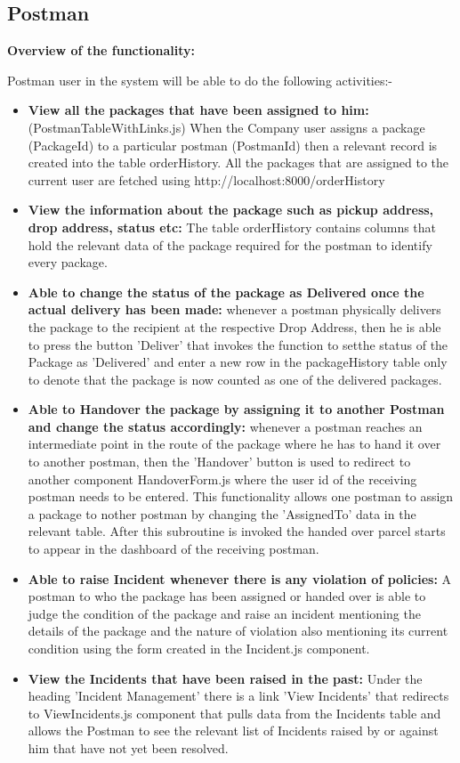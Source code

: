 \subsection{Postman}
\textbf{Overview of the functionality:}

Postman user in the system will be able to do the following activities:-
\begin{itemize}
\item {\textbf{View all the packages that have been assigned to him: }}(PostmanTableWithLinks.js) When the Company user assigns a package (PackageId) to a particular postman (PostmanId) then a relevant record is created into the table orderHistory. All the packages that are assigned to the current user are fetched using http://localhost:8000/orderHistory

\item \textbf{View the information about the package such as pickup address, drop address, status etc:} The table orderHistory contains columns that hold the relevant data of the package required for the postman to identify every package.
\item \textbf{Able to change the status of the package as Delivered once the actual delivery has been made:} whenever a postman physically delivers the package to the recipient at the respective Drop Address, then he is able to press the button 'Deliver' that invokes the function to setthe status of the Package as 'Delivered' and enter a new row in the packageHistory table only to denote that the package is now counted as one of the delivered packages.
\item \textbf{Able to Handover the package by assigning it to another Postman and change the status accordingly: }whenever a postman reaches an intermediate point in the route of the package where he has to hand it over to another postman, then the 'Handover' button is used to redirect to another component HandoverForm.js where the user id of the receiving postman needs to be entered. This functionality allows one postman to assign a package to nother postman by changing the 'AssignedTo' data in the relevant table. After this subroutine is invoked the handed over parcel  starts to appear in the dashboard of the receiving postman.
\item \textbf{Able to raise Incident whenever there is any violation of policies:} A postman to who the package has been assigned or handed over is able to judge the condition of the package and raise an incident mentioning the details of the package and the nature of violation also mentioning its current condition using the form created in the Incident.js component.
\item \textbf{View the Incidents that have been raised in the past: }Under the heading 'Incident Management' there is a link 'View Incidents' that redirects to ViewIncidents.js component that pulls data from the Incidents table and allows the Postman to see the relevant list of Incidents raised by or against him that have not yet been resolved.
\end{itemize}

